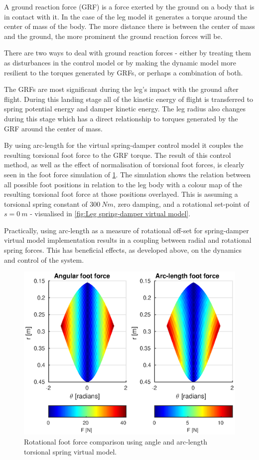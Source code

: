 A ground reaction force (GRF) is a force exerted by the ground on a body that is in contact with it. In the case of the leg model it generates a torque around the center of mass of the body. The more distance there is between the center of mass and the ground, the more prominent the ground reaction forces will be. 

There are two ways to deal with ground reaction forces - either by treating them as disturbances in the control model or by making the dynamic model more resilient to the torques generated by GRFs, or perhaps a combination of both. 

The GRFs are most significant during the leg's impact with the ground after flight. During this landing stage all of the kinetic energy of flight is transferred to spring potential energy and damper kinetic energy. The leg radius also changes during this stage which has a direct relationship to torques generated by the GRF around the center of mass. 

By using arc-length for the virtual spring-damper control model it couples the resulting torsional foot force to the GRF torque. The result of this control method, as well as the effect of normalisation of torsional foot forces, is clearly seen in the foot force simulation of \cref{fig:Rotational foot force comparison}. The simulation shows the relation between all possible foot positions in relation to the leg body with a colour map of the resulting torsional foot force at those positions overlayed. This is assuming a torsional spring constant of $300\ Nm$, zero damping, and a rotational set-point of $s = 0\ m$ - visualised in \cref{fig:Leg spring-damper virtual model}.

Practically, using arc-length as a measure of rotational off-set for spring-damper virtual model implementation results in a coupling between radial and rotational spring forces. This has beneficial effects, as developed above, on the dynamics and control of the system.

\begin{figure}
\centering
\includegraphics[width=1\textwidth]{images/control/theta-vs-arc.eps} 
\caption{Rotational foot force comparison using angle and arc-length torsional spring virtual model.}
\label{fig:Rotational foot force comparison}
\end{figure}


